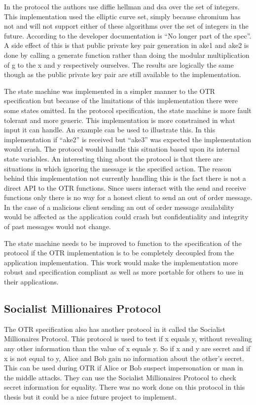 In the protocol the authors use diffie hellman and dsa over the set of integers. This implementation used the elliptic curve set, simply because chromium has not and will not support either of these algorithms over the set of integers in the future. According to the developer documentation is “No longer part of the spec”. \cite{webcrypto-chromium} A side effect of this is that public private key pair generation in ake1 and ake2 is done by calling a generate function rather than doing the modular multiplication of g to the x and y respectively ourselves. The results are logically the same though as the public private key pair are still available to the implementation.  


The state machine was implemented in a simpler manner to the OTR specification but because of the limitations of this implementation there were some states omitted. In the protocol specification, the state machine is more fault tolerant and more generic. This implementation is more constrained in what input it can handle. An example can be used to illustrate this. In this implementation if “ake2” is received but “ake3” was expected the implementation would crash. The protocol would handle this situation based upon its internal state variables. An interesting thing about the protocol is that there are situations in which ignoring the message is the specified action. The reason behind this implementation not currently handling this is the fact there is not a direct API to the OTR functions. Since users interact with the send and receive functions only there is no way for a honest client to send an out of order message. In the case of a malicious client sending an out of order message availability would be affected as the application could crash but confidentiality and integrity of past messages would not change. 


The state machine needs to be improved to function to the specification of the protocol if the OTR implementation is to be completely decoupled from the application implementation. This work would make the implementation more robust and specification compliant as well as more portable for others to use in their applications.


\subsection{Socialist Millionaires Protocol}


The OTR specification also has another protocol in it called the Socialist Millionaires Protocol. This protocol is used to test if x equals y, without revealing any other information than the value of x equals y. So if x and y are secret and if x is not equal to y, Alice and Bob gain no information about the other’s secret. This can be used during OTR if Alice or Bob suspect impersonation or man in the middle attacks. They can use the Socialist Millionaires Protocol to check secret information for equality. There was no work done on this protocol in this thesis but it could be a nice future project to implement.


